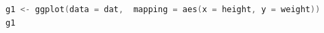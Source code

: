 \begin{lstlisting}[language=c++,label={code:05_10},caption={まずはキャンパスを設定する}]
g1 <- ggplot(data = dat,  mapping = aes(x = height, y = weight))
g1
\end{lstlisting}
